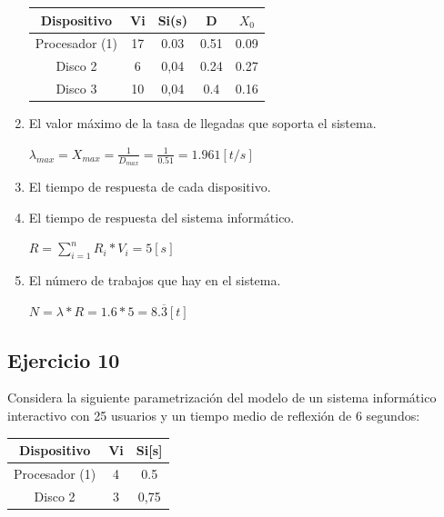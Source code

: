 \begin{enumerate}
\begin{tcolorbox}[colback=white,colframe=cyan!50!black,fonttitle=\bfseries]
\begin{table}[H]
\begin{tabular}{|c|c|c|c|c|}
    \textbf{Dispositivo} & \textbf{Vi} & \textbf{Si(s)} & \textbf{D} & \textbf{$X_0$}\\ \hline
    Procesador (1) & 17 & 0.03 & 0.51 & 0.09\\ \hline
    Disco 2        & 6  & 0,04 & 0.24 & 0.27\\ \hline
    Disco 3        & 10 & 0,04 & 0.4  & 0.16\\ \hline
    \end{tabular}\end{table}
    \end{tcolorbox}
    \item El valor máximo de la tasa de llegadas que soporta el sistema.
    \begin{tcolorbox}[colback=white,colframe=cyan!50!black,fonttitle=\bfseries]
    $\lambda_{max}=X_{max}=\frac{1}{D_{max}}= \frac{1}{0.51}= 1.961[t/s]$
    \end{tcolorbox}
    \item El tiempo de respuesta de cada dispositivo.
    \begin{tcolorbox}[colback=white,colframe=cyan!50!black,fonttitle=\bfseries]
    
    \end{tcolorbox}
    \item El tiempo de respuesta del sistema informático.
    \begin{tcolorbox}[colback=white,colframe=cyan!50!black,fonttitle=\bfseries]
    $R=\sum_{i=1}^nR_i*V_i=5[s]$
    \end{tcolorbox}
    \item El número de trabajos que hay en el sistema.
    \begin{tcolorbox}[colback=white,colframe=cyan!50!black,fonttitle=\bfseries]
    $N=\lambda*R=1.6*5=8.\overline{3}[t]$
    \end{tcolorbox}
\end{enumerate}
\subsection{Ejercicio 10}
Considera la siguiente parametrización del modelo de un sistema informático interactivo con 25 usuarios y un tiempo medio de reflexión de 6 segundos:

\begin{table}[H]\centering
\begin{tabular}{|c|c|c|}
\hline
\textbf{Dispositivo}    & \textbf{Vi} & \textbf{Si[s]} \\ \hline
Procesador (1) & 4  & 0.5    \\ \hline
Disco 2        & 3  & 0,75   \\ \hline
\end{tabular}
\end{table}

